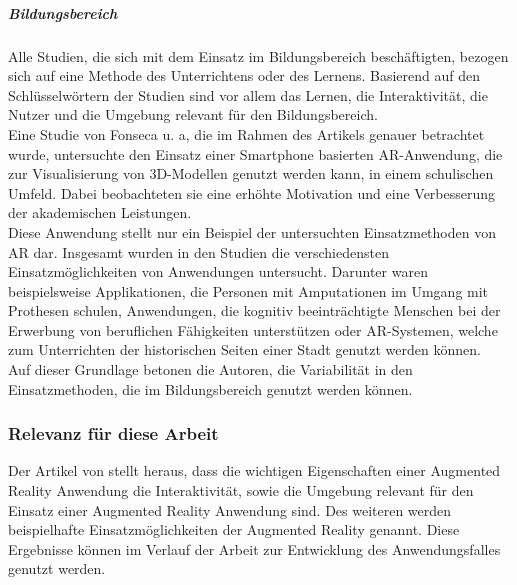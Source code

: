 \subparagraph{Bildungsbereich}
Alle Studien, die sich mit dem Einsatz im Bildungsbereich beschäftigten, bezogen sich auf eine Methode des Unterrichtens oder des Lernens. Basierend auf den Schlüsselwörtern der Studien sind vor allem das Lernen, die Interaktivität, die Nutzer und die Umgebung relevant für den Bildungsbereich.\\
Eine Studie von Fonseca u. a, die im Rahmen des Artikels genauer betrachtet wurde, untersuchte den Einsatz einer Smartphone basierten AR-Anwendung, die zur Visualisierung von 3D-Modellen genutzt werden kann, in einem schulischen Umfeld. Dabei beobachteten sie eine erhöhte Motivation und eine Verbesserung der akademischen Leistungen. \\
Diese Anwendung stellt nur ein Beispiel der untersuchten Einsatzmethoden von AR dar. Insgesamt wurden in den Studien die verschiedensten Einsatzmöglichkeiten von Anwendungen untersucht. Darunter waren beispielsweise Applikationen, die Personen mit Amputationen im Umgang mit Prothesen schulen, Anwendungen, die kognitiv beeinträchtigte Menschen bei der Erwerbung von beruflichen Fähigkeiten unterstützen oder AR-Systemen, welche zum Unterrichten der historischen Seiten einer Stadt genutzt werden können. \\
Auf dieser Grundlage betonen die Autoren, die Variabilität in den Einsatzmethoden, die im Bildungsbereich genutzt werden können. \citep[Kapitel 4.2]{dey:review-of-ar-studies}

\subsubsection{Relevanz für diese Arbeit}
Der Artikel von \citeauthor{dey:review-of-ar-studies} stellt heraus, dass die wichtigen Eigenschaften einer Augmented Reality Anwendung die Interaktivität, sowie die Umgebung relevant für den Einsatz einer Augmented Reality Anwendung sind. Des weiteren werden beispielhafte Einsatzmöglichkeiten der Augmented Reality genannt. Diese Ergebnisse können im Verlauf der Arbeit zur Entwicklung des Anwendungsfalles genutzt werden.

